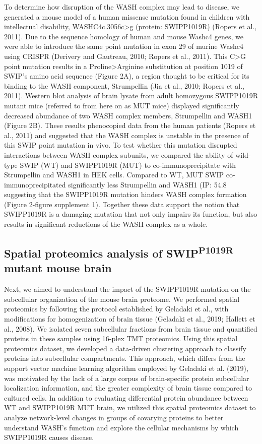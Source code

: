 To determine how disruption of the WASH complex may lead to
disease, we generated a mouse model of a human missense mutation found in
children with intellectual disability, WASHC4c.3056c>g (protein: SWIPP1019R)
(Ropers et al., 2011). Due to the sequence homology of human and mouse Washc4
genes, we were able to introduce the same point mutation in exon 29 of murine
Washc4 using CRISPR (Derivery and Gautreau, 2010; Ropers et al., 2011). This C>G
point mutation results in a Proline>Arginine substitution at position 1019 of
SWIP’s amino acid sequence (Figure 2A), a region thought to be critical for its
binding to the WASH component, Strumpellin (Jia et al., 2010; Ropers et al.,
2011). Western blot analysis of brain lysate from adult homozygous SWIPP1019R
mutant mice (referred to from here on as MUT mice) displayed significantly
decreased abundance of two WASH complex members, Strumpellin and WASH1 (Figure
2B). These results phenocopied data from the human patients (Ropers et al.,
2011) and suggested that the WASH complex is unstable in the presence of this
SWIP point mutation in vivo. To test whether this mutation disrupted
interactions between WASH complex subunits, we compared the ability of wild-type
SWIP (WT) and SWIPP1019R (MUT) to co-immunoprecipitate with Strumpellin and
WASH1 in HEK cells. Compared to WT, MUT SWIP co-immunoprecipitated significantly
less Strumpellin and WASH1 (IP: 54.8%
suggesting that the SWIPP1019R mutation hinders WASH complex formation (Figure
2-figure supplement 1). Together these data support the notion that SWIPP1019R
is a damaging mutation that not only impairs its function, but also results in
significant reductions of the WASH complex as a whole.

\subsection{Spatial proteomics analysis of SWIP\textsuperscript{P1019R} 
mutant mouse brain}

Next, we aimed to understand the impact of the SWIPP1019R mutation on the
subcellular organization of the mouse brain proteome. We performed spatial
proteomics by following the protocol established by Geladaki et al., with
modifications for homogenization of brain tissue (Geladaki et al., 2019; Hallett
et al., 2008). We isolated seven subcellular fractions from brain tissue and
quantified proteins in these samples using 16-plex TMT proteomics. Using this
spatial proteomics dataset, we developed a data-driven clustering approach to
classify proteins into subcellular compartments. This approach, which differs
from the support vector machine learning algorithm employed by Geladaki et al.
(2019), was motivated by the lack of a large corpus of brain-specific protein
subcellular localization information, and the greater complexity of brain tissue
compared to cultured cells. In addition to evaluating differential protein
abundance between WT and SWIPP1019R MUT brain, we utilized this spatial
proteomics dataset to analyze network-level changes in groups of covarying
proteins to better understand WASH’s function and explore the cellular
mechanisms by which SWIPP1019R causes disease. 

